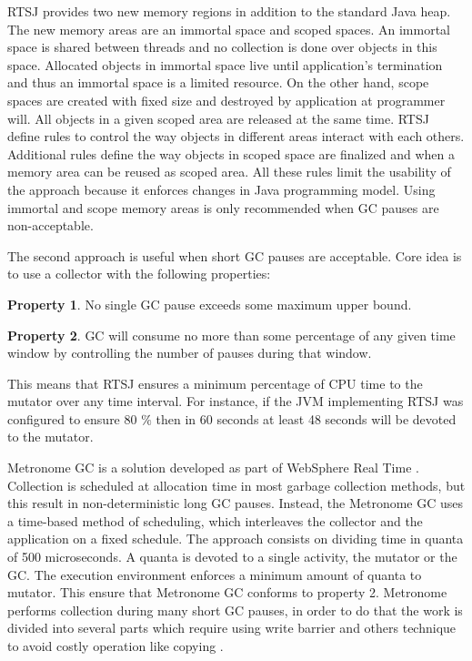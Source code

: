 RTSJ provides two new memory regions in addition to the standard Java heap.
The new memory areas are an immortal space and scoped spaces.
An immortal space is shared between threads and no collection is done over objects in this space.
Allocated objects in immortal space live until application's termination and thus an immortal space is a limited resource.
On the other hand, scope spaces are created with fixed size and destroyed by application at programmer will.
All objects in a given scoped area are released at the same time.
RTSJ define rules to control the way objects in different areas interact with each others.
Additional rules define the way objects in scoped space are finalized and when a memory area can be reused as scoped area.
All these rules limit the usability of the approach because it enforces changes in Java programming model.
Using immortal and scope memory areas is only recommended when GC pauses are non-acceptable.

The second approach is useful when short GC pauses are acceptable. Core idea is to use a collector with the following properties:
\begin{description}
\item \textbf{Property 1}. No single GC pause exceeds some maximum upper bound.
\item \textbf{Property 2}. GC will consume no more than some percentage of any given time window by controlling the number of pauses during that window.
\end{description} 
This means that RTSJ ensures a minimum percentage of CPU time to the mutator over any time interval.
For instance, if the JVM implementing RTSJ was configured to ensure 80 $\%$ then in 60 seconds at least 48 seconds will be devoted to the mutator.

Metronome GC is a solution developed as part of WebSphere Real Time \cite{Bacon03themetronome:}.
Collection is scheduled at allocation time in most garbage collection methods, but this result in non-deterministic long GC pauses.
Instead, the Metronome GC uses a time-based method of scheduling, which interleaves the collector and the application on a fixed schedule.
The approach consists on dividing time in quanta of 500 microseconds.
A quanta is devoted to a single activity, the mutator or the GC.
The execution environment enforces a minimum amount of quanta to mutator.
This ensure that Metronome GC conforms to property 2.
Metronome performs collection during many short GC pauses, in order to do that the work is divided into several parts which require using write barrier and others technique to avoid costly operation like copying \cite{Bacon03themetronome:}.

